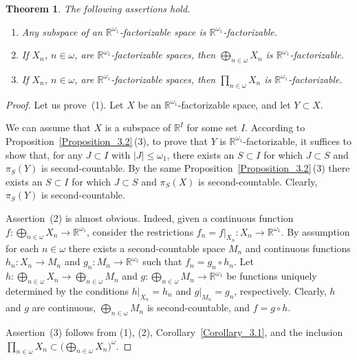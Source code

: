\documentclass[a4paper,12pt]{amsart}
\newtheorem{theorem}{Theorem}[section]
\theoremstyle{definition}
\theoremstyle{remark}
\begin{document}
\begin{theorem}
\label{Theorem_3.3}
The following assertions hold.
\begin{enumerate}
\item[\rm(1)]
Any subspace of an $\mathbb R^{\omega_1}$-factorizable space is $\mathbb R^{\omega_1}$-factorizable. 
\item[\rm(2)]
If $X_n$, $n\in \omega$, are $\mathbb R^{\omega_1}$-factorizable spaces, then 
$\bigoplus_{n\in \omega} X_n$ is $\mathbb R^{\omega_1}$-factorizable.
\item[\rm(3)]
If $X_n$, $n\in \omega$, are $\mathbb R^{\omega_1}$-factorizable spaces, then 
$\prod_{n\in \omega} X_n$ is $\mathbb R^{\omega_1}$-fac\-tor\-iz\-able.
\end{enumerate}
\end{theorem}

\begin{proof}
Let us prove~(1). 
Let $X$ be an $\mathbb R^{\omega_1}$-factorizable space, and let $Y \subset X$. 

We can assume that $X$ is a subspace of $\mathbb R^{I}$ for some set $I$.
According to Proposition~\ref{Proposition_3.2}\,(3), to prove that $Y$ is $\mathbb R^{\omega_1}$-factorizable, 
it suffices to show that, for any $J\subset I$ with $|J|\le \omega_1$, there exists an $S\subset I$ 
for which $J\subset S$ and $\pi_S(Y)$ is second-countable.
By the same Proposition~\ref{Proposition_3.2}\,(3) there exists an $S\subset I$ for which $J\subset S$ 
and $\pi_S(X)$ is second-countable. Clearly, $\pi_S(Y)$ is second-countable.

Assertion~(2) is almost obvious. Indeed, given a continuous function $f\colon \bigoplus_{n\in \omega}X_n\to 
\mathbb R^{\omega_1}$, consider the restrictions $f_n=f|_{X_n}\colon X_n\to \mathbb R^{\omega_1}$. By assumption 
for each $n\in \omega$ there exists a second-countable space $M_n$ and continuous functions $h_n\colon X_n\to 
M_n$ and $g_n\colon M_n \to \mathbb R^{\omega_1}$ such that $f_n=g_n\circ h_n$. Let $h\colon \bigoplus_{n\in 
\omega}X_n\to \bigoplus_{n\in \omega} M_n$ and $g\colon \bigoplus_{n\in \omega} M_n\to \mathbb R^{\omega_1}$ be 
functions uniquely determined by the conditions $h|_{X_n}=h_n$ and $g|_{M_n}=g_n$, respectively. Clearly, $h$ and 
$g$ are continuous, $\bigoplus_{n\in \omega} M_n$ is second-countable, and $f=g\circ h$. 

Assertion~(3) follows from (1), (2), Corollary~\ref{Corollary_3.1}, and the 
inclusion $\prod_{n\in \omega}X_n\subset 
\bigl(\bigoplus_{n\in \omega}X_n\bigr)^\omega$.
\end{proof}
\end{document}
